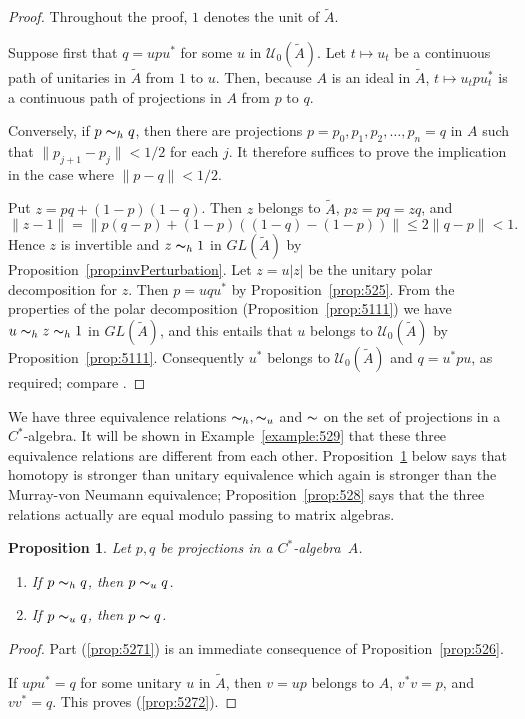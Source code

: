 \documentclass{book}
\newtheorem{proposition}[definition]{Proposition}
\def\cstar{\(C^*\)-algebra}
\begin{document}
\begin{proof}
  Throughout the proof, \(1\) denotes the unit of \(\widetilde{A}\).\par
  Suppose first that \(q=upu^*\) for some \(u\) in \(\mathcal{U}_0(\widetilde{A})\).
  Let \(t\mapsto u_t\) be a continuous path of unitaries in \(\widetilde{A}\) from \(1\) to \(u\).
  Then, because \(A\) is an ideal in \(\widetilde{A}\), \(t\mapsto u_t p u_t^*\) is a continuous path of projections in \(A\) from \(p\) to \(q\).\par
  Conversely, if \(p\thicksim_h q\), then there are projections \(p=p_0,p_1,p_2,\ldots,p_n=q\) in \(A\) such that \(\|p_{j+1}-p_j\|<1/2\) for each \(j\).
  It therefore suffices to prove the implication in the case where \(\|p-q\|<1/2\).\par
  Put \(z=pq+(1-p)(1-q)\). Then \(z\) belongs to \(\widetilde{A}\), \(pz=pq=zq\), and
  \[
    \|z-1\|=\|p(q-p)+(1-p)((1-q)-(1-p))\|\leq 2\|q-p\|<1.
  \]
  Hence \(z\) is invertible and \(z\thicksim_h 1\) in \(GL(\widetilde{A})\) by Proposition~\ref{prop:invPerturbation}.
  Let \(z=u|z|\) be the unitary polar decomposition for \(z\). Then \(p=uqu^*\) by Proposition~\ref{prop:525}.
  From the properties of the polar decomposition (Proposition~\ref{prop:5111}) we have \(u\thicksim_h z\thicksim_h 1\)
  in \(GL(\widetilde{A})\), and this entails that \(u\) belongs to \(\mathcal{U}_0(\widetilde{A})\) by Proposition~\ref{prop:5111}.
  Consequently \(u^*\) belongs to \(\mathcal{U}_0(\widetilde{A})\) and \(q=u^*pu\), as required; compare
  \cite[Proposition~4.6.6 and Theorem~4.6.7]{Blackadar1998}.
\end{proof}
We have three equivalence relations \(\thicksim_h, \thicksim_u\) and \(\thicksim\) on the set of projections in a \cstar.
It will be shown in Example~\ref{example:529} that these three equivalence relations are different from each other.
Proposition~\ref{prop:527} below says that homotopy is stronger than unitary equivalence which again is stronger than the Murray-von Neumann
equivalence; Proposition~\ref{prop:528} says that the three relations actually are equal modulo passing to matrix algebras.
\begin{proposition}\label{prop:527}
  Let \(p, q\) be projections in a \cstar\ \(A\).
  \begin{enumerate}
    \item\label{prop:5271} If \(p\thicksim_h q\), then \(p\thicksim_u q\).
    \item\label{prop:5272} If \(p\thicksim_u q\), then \(p\thicksim q\).
  \end{enumerate}
\end{proposition}
\begin{proof}
  Part (\ref{prop:5271}) is an immediate consequence of Proposition~\ref{prop:526}.\par
  If \(upu^*=q\) for some unitary \(u\) in \(\widetilde{A}\), then \(v=up\) belongs to \(A\), \(v^*v=p\), and \(vv^*=q\). This proves (\ref{prop:5272}).
\end{proof}
\end{document}
